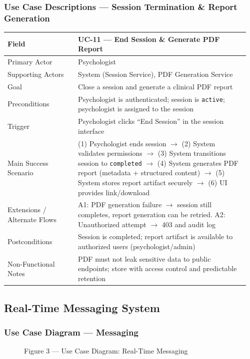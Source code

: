 \documentclass[12pt]{article}
\begin{document}
\subsubsection*{Use Case Descriptions --- Session Termination \& Report Generation}
\begin{longtable}{L{0.28\linewidth} L{0.68\linewidth}}
\toprule
\textbf{Field} & \textbf{UC-11 --- End Session \& Generate PDF Report} \\
\midrule
\endhead
Primary Actor & Psychologist \\
Supporting Actors & System (Session Service), PDF Generation Service \\
Goal & Close a session and generate a clinical PDF report \\
Preconditions & Psychologist is authenticated; session is \texttt{active}; psychologist is assigned to the session \\
Trigger & Psychologist clicks ``End Session'' in the session interface \\
Main Success Scenario & (1) Psychologist ends session $\rightarrow$ (2) System validates permissions $\rightarrow$ (3) System transitions session to \texttt{completed} $\rightarrow$ (4) System generates PDF report (metadata + structured content) $\rightarrow$ (5) System stores report artifact securely $\rightarrow$ (6) UI provides link/download \\
Extensions / Alternate Flows & A1: PDF generation failure $\rightarrow$ session still completes, report generation can be retried. A2: Unauthorized attempt $\rightarrow$ 403 and audit log \\
Postconditions & Session is completed; report artifact is available to authorized users (psychologist/admin) \\
Non-Functional Notes & PDF must not leak sensitive data to public endpoints; store with access control and predictable retention \\
\bottomrule
\end{longtable}

\subsection{Real-Time Messaging System}
\subsubsection*{Use Case Diagram --- Messaging}
\begin{figure}[h]
  \centering
  \caption{Figure 3 --- Use Case Diagram: Real-Time Messaging}
\end{figure}
\end{document}
